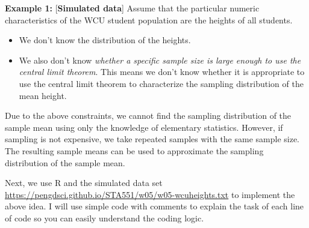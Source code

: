 \documentclass[
]{book}
\newenvironment{Shaded}{\begin{snugshade}}{\end{snugshade}}
\newcommand{\AttributeTok}[1]{\textcolor[rgb]{0.13,0.29,0.53}{#1}}
\newcommand{\CommentTok}[1]{\textcolor[rgb]{0.56,0.35,0.01}{\textit{#1}}}
\newcommand{\ConstantTok}[1]{\textcolor[rgb]{0.56,0.35,0.01}{#1}}
\newcommand{\ControlFlowTok}[1]{\textcolor[rgb]{0.13,0.29,0.53}{\textbf{#1}}}
\newcommand{\DecValTok}[1]{\textcolor[rgb]{0.00,0.00,0.81}{#1}}
\newcommand{\FunctionTok}[1]{\textcolor[rgb]{0.13,0.29,0.53}{\textbf{#1}}}
\newcommand{\NormalTok}[1]{#1}
\newcommand{\OtherTok}[1]{\textcolor[rgb]{0.56,0.35,0.01}{#1}}
\newcommand{\SpecialCharTok}[1]{\textcolor[rgb]{0.81,0.36,0.00}{\textbf{#1}}}
\newcommand{\StringTok}[1]{\textcolor[rgb]{0.31,0.60,0.02}{#1}}
\begin{document}
\textbf{Example 1:} {[}\textbf{Simulated data}{]} Assume that the particular numeric characteristics of the WCU student population are the heights of all students.

\begin{itemize}
\item
  We don't know the distribution of the heights.
\item
  We also don't know \emph{whether a specific sample size is large enough to use the central limit theorem}. This means we don't know whether it is appropriate to use the central limit theorem to characterize the sampling distribution of the mean height.
\end{itemize}

Due to the above constraints, we cannot find the sampling distribution of the sample mean using only the knowledge of elementary statistics. However, if sampling is not expensive, we take repeated samples with the same sample size. The resulting sample means can be used to approximate the sampling distribution of the sample mean.

Next, we use R and the simulated data set \url{https://pengdsci.github.io/STA551/w05/w05-wcuheights.txt} to implement the above idea. I will use simple code with comments to explain the task of each line of code so you can easily understand the coding logic.

\begin{Shaded}
\end{Shaded}
\end{document}
